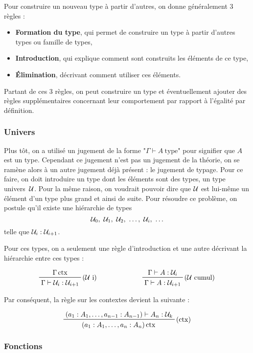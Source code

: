 \documentclass[../../rapport.tex]{subfiles}
\begin{document}
  Pour construire un nouveau type à partir d'autres, on donne généralement 3 règles :
  \begin{itemize}
    \item \textbf{Formation du type}, qui permet de construire un type à partir d'autres types ou famille de types,
    \item \textbf{Introduction}, qui explique comment sont construits les éléments de ce type,
    \item \textbf{Élimination}, décrivant comment utiliser ces éléments.
  \end{itemize}
  Partant de ces 3 règles, on peut construire un type et éventuellement ajouter des règles supplémentaires concernant
  leur comportement par rapport à l'égalité par définition.

  \subsubsection{Univers}

  Plus tôt, on a utilisé un jugement de la forme "$\Gamma \vdash A\ \text{type}$" pour signifier que $A$ est un type.
  Cependant ce jugement n'est pas un jugement de la théorie, on se ramène alors à un autre jugement déjà présent :
  le jugement de typage.
  Pour ce faire, on doit introduire un type dont les éléments sont des types, un type univers\ $\mathcal U$.
  Pour la même raison, on voudrait pouvoir dire que $\mathcal U$ est lui-même un élément d'un type plus grand et ainsi de suite.
  Pour résoudre ce problème, on postule qu'il existe une hiérarchie de types
  $$\U_0,\ \U_1,\ \U_2,\ \hdots,\ \U_i,\ \hdots$$
  telle que $\mathcal U_i : \mathcal U_{i+1}$.

  Pour ces types, on a seulement une règle d'introduction et une autre décrivant la hiérarchie entre ces types :

  $$
  \begin{array}{cc}
    \prftree[r]{($\U$ i)}{\Gamma \ctx}{\Gamma \vdash \U_i : \U_{i+1}} \hspace{2cm}
    & \prftree[r]{($\U$ cumul)}{\Gamma \vdash A : \U_i}{\Gamma \vdash A : \U_{i+1}}
  \end{array}
  $$

  Par conséquent, la règle sur les contextes devient la suivante :

  $$
  \prftree[r]{($\ctx$)}{(a_1 : A_1, \hdots, a_{n-1} : A_{n-1}) \vdash A_n : \U_k}
    {(a_1 : A_1, \hdots, a_n : A_n) \ctx}
  $$

  \subsubsection{Fonctions}
\end{document}
